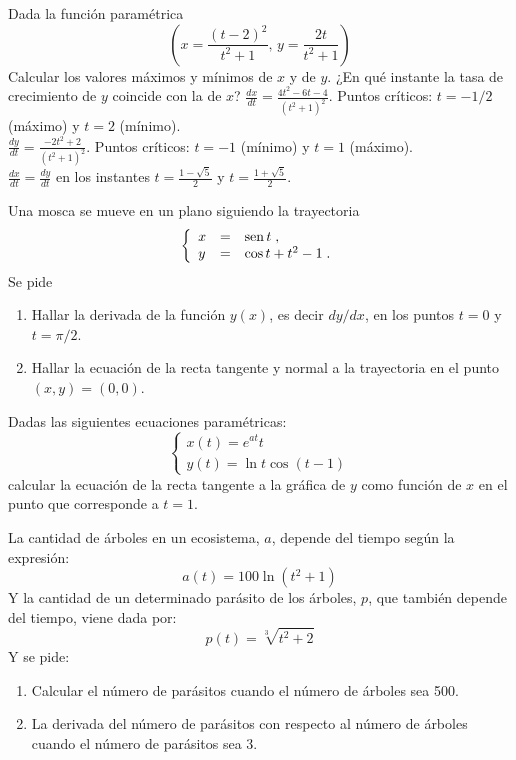 {Dada la función paramétrica
\[
\left(
    x =\frac{(t-2)^2}{t^2+1},\, y=\dfrac{2t}{t^2+1}
\right)
\]
Calcular los valores máximos y mínimos de $x$ y de $y$. ¿En qué instante la tasa de crecimiento de $y$ coincide con la de $x$?
}
{$\frac{dx}{dt}=\frac{4t^2-6t-4}{(t^2+1)^2}$. Puntos críticos: $t=-1/2$ (máximo) y $t=2$ (mínimo).\\
$\frac{dy}{dt}=\frac{-2t^2+2}{(t^2+1)^2}$. Puntos críticos: $t=-1$ (mínimo) y $t=1$ (máximo).\\
$\frac{dx}{dt}=\frac{dy}{dt}$ en los instantes $t=\frac{1-\sqrt 5}{2}$ y $t=\frac{1+\sqrt 5}{2}$.
}
{
}


{Una mosca se mueve en un plano siguiendo la trayectoria
\[
\left\{
\begin{array}{lll}
x & = & \operatorname{sen} t
\; ,
\\
y & = & \cos t + t^2 - 1
\; .
\end{array}
\right.
\]
Se pide
\begin{enumerate}
\item Hallar la derivada de la función $y(x)$, es decir $dy/dx$,
en los puntos $t=0$ y $t=\pi/2$.
\item Hallar la ecuación de la recta tangente y normal a la trayectoria
en el punto $(x,y)=(0,0)$.
\end{enumerate}
}


{Dadas las siguientes ecuaciones paramétricas:
\[
\left\{
\begin{array}{l}
x(t)=e^{at}t \\
y(t)=\ln t\cos (t-1)
\end{array}
\right.
\] 
calcular la ecuación de la recta tangente a la gráfica de $y$ como función de $x$ en el punto que corresponde a $t=1$.
}


{La cantidad de árboles en un ecosistema, $a$, depende del tiempo según la expresión:
\[
a(t)=100\ln(t^2+1)
\]
Y la cantidad de un determinado parásito de los árboles, $p$, que también depende del tiempo, viene dada por:
\[
p(t) = \sqrt[3]{{t^2  + 2}}
\]
Y se pide:
\begin{enumerate}
\item Calcular el número de parásitos cuando el número de árboles sea 500.
\item La derivada del número de parásitos con respecto al número de árboles cuando el número de parásitos sea 3.
\end{enumerate}
}


